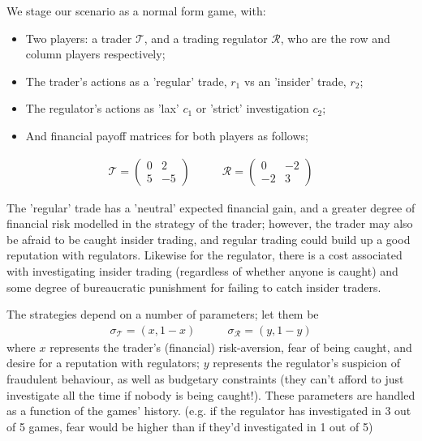 \documentclass{article}
\begin{document}
We stage our scenario as a normal form game, with:
\begin{itemize}
\item Two players: a trader $\mathcal{T}$, and a trading regulator $\mathcal{R}$, who are the row and column players respectively;
\item The trader's actions as a 'regular' trade, $r_1$ vs an 'insider' trade, $r_2$;
\item The regulator's actions as 'lax' $c_1$ or 'strict' investigation $c_2$;
\item And financial payoff matrices for both players as follows;
\end{itemize}
\begin{equation*}
\begin{split}
    \mathcal{T} = 
    \begin{pmatrix}
    0 & 2 \\
    5 & -5
    \end{pmatrix}
\end{split}
\quad\quad
\begin{split}
    \mathcal{R} = 
    \begin{pmatrix}
    0 & -2 \\
    -2 & 3
    \end{pmatrix}
\end{split}
\end{equation*}

The 'regular' trade has a 'neutral' expected financial gain, and a greater degree of financial risk modelled in the strategy of the trader; however, the trader may also be afraid to be caught insider trading, and regular trading could build up a good reputation with regulators. Likewise for the regulator, there is a cost associated with investigating insider trading (regardless of whether anyone is caught) and some degree of bureaucratic punishment for failing to catch insider traders.

The strategies depend on a number of parameters; let them be
\begin{equation*}
\begin{split}
    \sigma_\mathcal{T} = (x, 1-x)
\end{split}
\quad\quad
\begin{split}
    \sigma_\mathcal{R} = (y, 1-y)
\end{split}
\end{equation*}
where $x$ represents the trader's (financial) risk-aversion, fear of being caught, and desire for a reputation with regulators; $y$ represents the regulator's suspicion of fraudulent behaviour, as well as budgetary constraints (they can't afford to just investigate all the time if nobody is being caught!). These parameters are handled as a function of the games' history. (e.g. if the regulator has investigated in 3 out of 5 games, fear would be higher than if they'd investigated in 1 out of 5)
\end{document}
